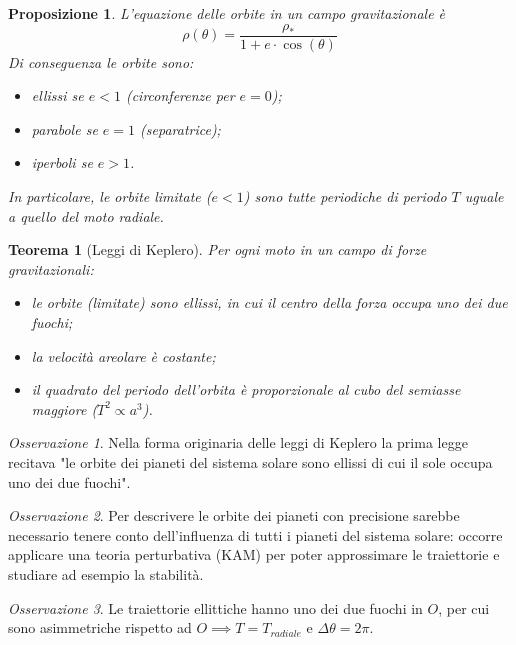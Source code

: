 \documentclass{book}
\theoremstyle{plain}
\newtheorem{teo}{Teorema}[chapter]
\theoremstyle{plain}
\theoremstyle{plain}
\theoremstyle{plain}
\theoremstyle{plain}
\newtheorem{prop}{Proposizione}[chapter]
\theoremstyle{definition}
\theoremstyle{remark}
\newtheorem*{oss}{Osservazione}
\theoremstyle{definition}
\begin{document}
\begin{prop}
     L'equazione delle orbite in un campo gravitazionale è
     \begin{displaymath}
         \rho(\theta)=\frac{\rho_*}{1+e\cdot \cos(\theta)}
     \end{displaymath}
     Di conseguenza le orbite sono:
     \begin{itemize}
         \item ellissi se $e<1$ (circonferenze per $e=0$);
         \item parabole se $e=1$ (separatrice);
         \item iperboli se $e>1$.
     \end{itemize}
     In particolare, le orbite limitate ($e<1$) sono tutte periodiche di periodo $T$ uguale a quello del moto radiale.
\end{prop}

\begin{teo}[Leggi di Keplero]
    Per ogni moto in un campo di forze gravitazionali:
    \begin{itemize}
        \item le orbite (limitate) sono ellissi, in cui il centro della forza occupa uno dei due fuochi;
        \item la velocità areolare è costante;
        \item il quadrato del periodo dell'orbita è proporzionale al cubo del semiasse maggiore ($T^2\propto a^3$).
    \end{itemize}
\end{teo}

\begin{oss}
    Nella forma originaria delle leggi di Keplero la prima legge recitava "le orbite dei pianeti del sistema solare sono ellissi di cui il sole occupa uno dei due fuochi".
\end{oss}

\begin{oss}
    Per descrivere le orbite dei pianeti con precisione sarebbe necessario tenere conto dell'influenza di tutti i pianeti del sistema solare: occorre applicare una teoria perturbativa (KAM) per poter approssimare le traiettorie e studiare ad esempio la stabilità.
\end{oss}

\begin{oss}
    Le traiettorie ellittiche hanno uno dei due fuochi in $O$, per cui sono asimmetriche rispetto ad $O\implies T=T_{radiale}$ e $\Delta\theta=2\pi$.
\end{oss}
\end{document}
